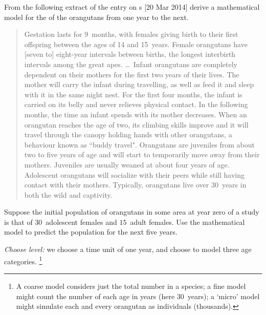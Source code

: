 \begin{example}[orangutans] \label{eg:orang}
From the following  extract of the  entry on s [20 Mar 2014] derive a mathematical model for the  of the orangutans from one year to the next.
\begin{quote}
Gestation lasts for 9~months, with females giving birth to their first offspring between the ages of 14 and 15~years. Female orangutans have [seven to] eight-year intervals between births, the longest interbirth intervals among the great apes. \ldots\  Infant orangutans are completely dependent on their mothers for the first two years of their lives. The mother will carry the infant during travelling, as well as feed it and sleep with it in the same night nest. For the first four months, the infant is carried on its belly and never relieves physical contact. In the following months, the time an infant spends with its mother decreases. When an orangutan reaches the age of two, its climbing skills improve and it will travel through the canopy holding hands with other orangutans, a behaviour known as ``buddy travel". Orangutans are juveniles from about two to five years of age and will start to temporarily move away from their mothers.  Juveniles are usually weaned at about four years of age. Adolescent orangutans will socialize with their peers while still having contact with their mothers. Typically, orangutans live over 30~years in both the wild and captivity.
\end{quote}
Suppose the initial population of orangutans in some area at year zero of a study is that of \(30\)~adolescent females and \(15\)~adult females.
Use the mathematical model to predict the population for the next five years.

\begin{solution} 
\emph{Choose level:}  we choose a time unit of one year, and choose to model three age categories.%
\footnote{A coarse model considers just the total number in a species; a fine model might count the number of each age in years (here 30~years); a `micro' model might simulate each and every orangutan as individuals (thousands).}


\end{solution}
\end{example}
